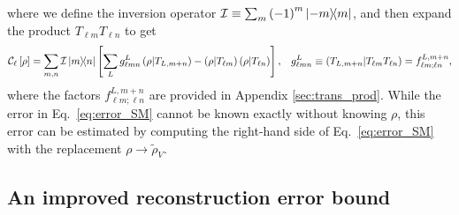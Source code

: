 \documentclass[notitlepage,twocolumn]{revtex4-2}
\newcommand{\p}[1]{\left(#1\right)} %
\renewcommand{\sp}[1]{\left[#1\right]} %
\newcommand{\C}{\mathcal{C}}
\newcommand{\I}{\mathcal{I}}
\def\obk#1{\mathinner{({#1})}}
\begin{document}
where we define the inversion operator $\I\equiv\sum_m \p{-1}^m\op{-m}{m}$, and then expand the product $T_{\ell m} T_{\ell n}$ to get
\begin{align}
  \C_\ell\sp{\rho} = \sum_{m,n} \I \op{m}{n}
  \sp{\sum_L g_{\ell mn}^L \obk{\rho|T_{L,m+n}}
    - \obk{\rho|T_{\ell m}} \obk{\rho|T_{\ell n}}},
  &&
  g_{\ell mn}^L \equiv \obk{T_{L,m+n} | T_{\ell m} T_{\ell n}}
  = f_{\ell m;\ell n}^{L,m+n},
\end{align}
where the factors $f_{\ell m;\ell n}^{L,m+n}$ are provided in Appendix \ref{sec:trans_prod}.
While the error in Eq.~\eqref{eq:error_SM} cannot be known exactly without knowing $\rho$, this error can be estimated by computing the right-hand side of Eq.~\eqref{eq:error_SM} with the replacement $\rho\to\tilde\rho_V$.

\subsection{An improved reconstruction error bound}
\end{document}
